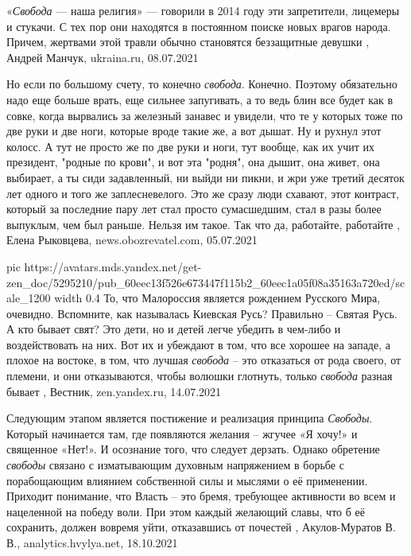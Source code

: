 «\emph{Свобода} — наша религия» — говорили в 2014 году эти запретители, лицемеры и
стукачи. С тех пор они находятся в постоянном поиске новых врагов народа.
Причем, жертвами этой травли обычно становятся беззащитные девушки
, 
Андрей Манчук, ukraina.ru, 08.07.2021

Но если по большому счету, то конечно \emph{свобода}. Конечно. Поэтому
обязательно надо еще больше врать, еще сильнее запугивать, а то ведь блин все
будет как в совке, когда вырвались за железный занавес и увидели, что те у
которых тоже по две руки и две ноги, которые вроде такие же, а вот дышат. Ну и
рухнул этот колосс. А тут не просто же по две руки и ноги, тут вообще, как их
учит их президент, "родные по крови", и вот эта "родня", она дышит, она живет,
она выбирает, а ты сиди задавленный, ни выйди ни пикни, и жри уже третий
десяток лет одного и того же заплесневелого. Это же сразу люди схавают, этот
контраст, который за последние пару лет стал просто сумасшедшим, стал в разы
более выпуклым, чем был раньше. Нельзя им такое. Так что да, работайте,
работайте
, 
Елена Рыковцева, news.obozrevatel.com, 05.07.2021

\ifcmt
  pic https://avatars.mds.yandex.net/get-zen_doc/5295210/pub_60eec13f526e673447f115b2_60eec1a05f08a35163a720ed/scale_1200
  width 0.4
\fi
То, что Малороссия является рождением Русского Мира, очевидно. Вспомните, как
называлась Киевская Русь? Правильно – Святая Русь. А кто бывает свят? Это дети,
но и детей легче убедить в чем-либо и воздействовать на них. Вот их и убеждают
в том, что все хорошее на западе, а плохое на востоке, в том, что лучшая
\emph{свобода} – это отказаться от рода своего, от племени, и они отказываются, чтобы
волюшки глотнуть, только \emph{свобода} разная бывает
, Вестник, zen.yandex.ru, 14.07.2021

Следующим этапом является постижение и реализация принципа \emph{Свободы}. Который
начинается там, где появляются желания – жгучее «Я хочу!» и священное «Нет!». И
осознание того, что следует дерзать. Однако обретение \emph{свободы} связано с
изматывающим духовным напряжением в борьбе с порабощающим влиянием собственной
силы и мыслями о её применении. Приходит понимание, что Власть – это бремя,
требующее активности во всем и нацеленной на победу воли. При этом каждый
желающий славы, что б её сохранить, должен вовремя уйти, отказавшись от
почестей
, 
Акулов-Муратов В. В., analytics.hvylya.net, 18.10.2021
